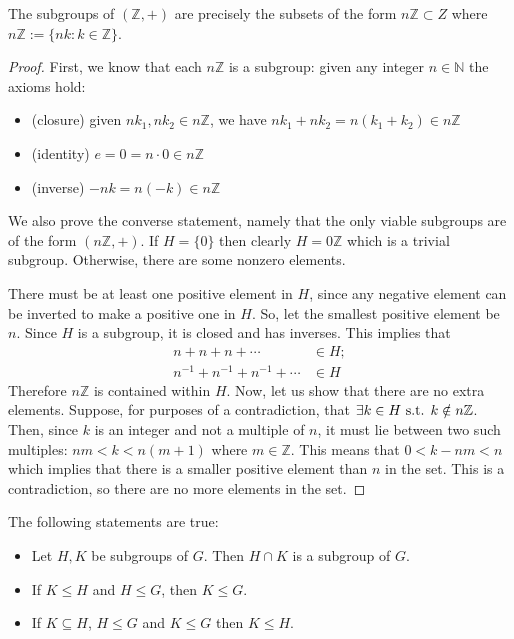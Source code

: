 \begin{proposition}
	The subgroups of \((\mathbb Z, +)\) are precisely the subsets of the form \(n\mathbb Z \subset Z\) where \(n\mathbb Z := \{nk : k\in \mathbb Z\}\).
\end{proposition}
\begin{proof}
	First, we know that each \(n\mathbb Z\) is a subgroup: given any integer \(n \in \mathbb N\) the axioms hold:
	\begin{itemize}
		\item (closure) given \(nk_1, nk_2 \in n\mathbb Z\), we have \(nk_1 + nk_2 = n(k_1 + k_2) \in n\mathbb Z\)
		\item (identity) \(e = 0 = n \cdot 0 \in n\mathbb Z\)
		\item (inverse) \(-nk = n(-k) \in n\mathbb Z\)
	\end{itemize}
	We also prove the converse statement, namely that the only viable subgroups are of the form \((n\mathbb Z, +)\).
	If \(H = \{ 0 \}\) then clearly \(H = 0\mathbb Z\) which is a trivial subgroup.
	Otherwise, there are some nonzero elements.

	There must be at least one positive element in \(H\), since any negative element can be inverted to make a positive one in \(H\).
	So, let the smallest positive element be \(n\).
	Since \(H\) is a subgroup, it is closed and has inverses.
	This implies that
	\begin{align*}
		n+n+n+\cdots                & \in H; \\
		n^{-1}+n^{-1}+n^{-1}+\cdots & \in H
	\end{align*}
	Therefore \(n\mathbb Z\) is contained within \(H\).
	Now, let us show that there are no extra elements.
	Suppose, for purposes of a contradiction, that \(\exists k \in H \text{ s.t. } k \notin n\mathbb Z\).
	Then, since \(k\) is an integer and not a multiple of \(n\), it must lie between two such multiples: \(nm < k < n(m+1)\) where \(m \in \mathbb Z\).
	This means that \(0 < k - nm < n\) which implies that there is a smaller positive element than \(n\) in the set.
	This is a contradiction, so there are no more elements in the set.
\end{proof}

\begin{proposition}
	The following statements are true:
	\begin{itemize}
		\item Let \(H, K\) be subgroups of \(G\).
		      Then \(H \cap K\) is a subgroup of \(G\).
		\item If \(K \leq H\) and \(H \leq G\), then \(K \leq G\).
		\item If \(K \subseteq H\), \(H \leq G\) and \(K \leq G\) then \(K \leq H\).
	\end{itemize}
\end{proposition}

